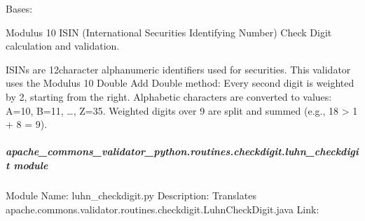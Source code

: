 \documentclass[letterpaper,10pt,english]{sphinxmanual}
\begin{document}
\begin{fulllineitems}
\label{\detokenize{apache_commons_validator_python.routines.checkdigit:apache_commons_validator_python.routines.checkdigit.isin_checkdigit.ISINCheckDigit}}
\pysigstartsignatures
{}
\pysigstopsignatures
\sphinxAtStartPar
Bases: 

\sphinxAtStartPar
Modulus 10 ISIN (International Securities Identifying Number) Check Digit
calculation and validation.

\sphinxAtStartPar
ISINs are 12\sphinxhyphen{}character alphanumeric identifiers used for securities.
This validator uses the Modulus 10 Double Add Double method:
\sphinxhyphen{} Every second digit is weighted by 2, starting from the right.
\sphinxhyphen{} Alphabetic characters are converted to values: A=10, B=11, …, Z=35.
\sphinxhyphen{} Weighted digits over 9 are split and summed (e.g., 18 \sphinxhyphen{}\textgreater{} 1 + 8 = 9).

\end{fulllineitems}



\subparagraph{apache\_commons\_validator\_python.routines.checkdigit.luhn\_checkdigit module}
\label{\detokenize{apache_commons_validator_python.routines.checkdigit:module-apache_commons_validator_python.routines.checkdigit.luhn_checkdigit}}\label{\detokenize{apache_commons_validator_python.routines.checkdigit:apache-commons-validator-python-routines-checkdigit-luhn-checkdigit-module}}
\sphinxAtStartPar
Module Name: luhn\_checkdigit.py
Description: Translates apache.commons.validator.routines.checkdigit.LuhnCheckDigit.java
Link: 
\end{document}
